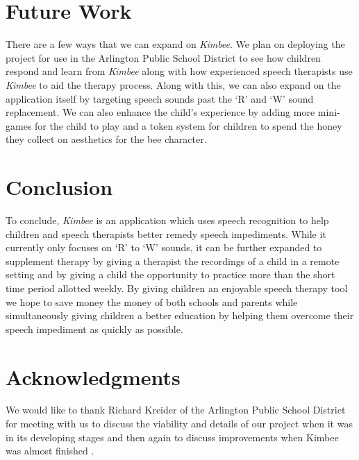 \documentclass{sig-alternate-2013}
\begin{document}
\section{Future Work}
\label{sec:future_work}

There are a few ways that we can expand on {\em Kimbee}. We plan on deploying the project for use in the Arlington Public School District to see how children respond and learn from {\em Kimbee} along with how experienced speech therapists use {\em Kimbee} to aid the therapy process. Along with this, we can also expand on the application itself by targeting speech sounds past the `R' and `W' sound replacement. We can also enhance the child's experience by adding more mini-games for the child to play and a token system for children to spend the honey they collect on aesthetics for the bee character.

\section{Conclusion}

To conclude, {\em Kimbee} is an application which uses speech recognition to help children and speech therapists better remedy speech impediments. While it currently only focuses on `R' to `W' sounds, it can be further expanded to supplement therapy by giving a therapist the recordings of a child in a remote setting and by giving a child the opportunity to practice more than the short time period allotted weekly. By giving children an enjoyable speech therapy tool we hope to save money the money of both schools and parents while simultaneously giving children a better education by helping them overcome their speech impediment as quickly as possible.

\section{Acknowledgments}

We would like to thank Richard Kreider of the Arlington Public School District for meeting with us to discuss the viability and details of our project when it was in its developing stages and then again to discuss improvements when Kimbee was almost finished \cite{Kreider:Intro,Kreider:Results}.




\balancecolumns
\end{document}
